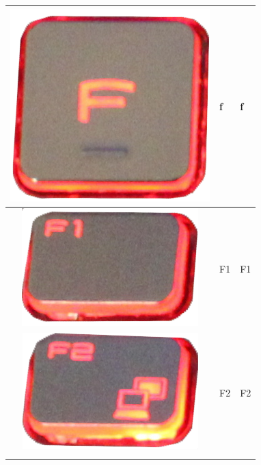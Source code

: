 \begin{longtable}{|cll|}
\begin{minipage}[c]{.4\textwidth}
\includegraphics[scale=0.08]{Images/KeyMapping/f}
\vspace{0.2cm}
\end{minipage} & f & f\\
\hline
\begin{minipage}[c]{.4\textwidth}
\vspace{0.2cm}
\includegraphics[scale=0.08]{Images/KeyMapping/F1}
\vspace{0.2cm}
\end{minipage} & F1 & F1\\
\hline
\begin{minipage}[c]{.4\textwidth}
\vspace{0.2cm}
\includegraphics[scale=0.08]{Images/KeyMapping/F2}
\vspace{0.2cm}
\end{minipage} & F2 & F2\\
\hline
\begin{minipage}[c]{.4\textwidth}

\end{minipage}
\end{longtable}
